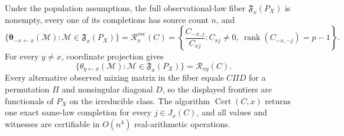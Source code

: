 Under the population assumptions, the full observational-law fiber \(\mathfrak F_x(P_X)\) is nonempty, every one of its completions has source count \(n\), and
\[
 \{\boldsymbol\theta_{-x\leftarrow x}(\mathcal M):\mathcal M\in\mathfrak F_x(P_X)\}
 =\mathcal R_x^{\mathrm{vec}}(C)
 =\left\{\frac{C_{-x,j}}{C_{xj}}:C_{xj}\ne0,\ \operatorname{rank}(C_{-x,-j})=p-1\right\}.
\]
For every \(y\ne x\), coordinate projection gives
\[
 \{\theta_{y\leftarrow x}(\mathcal M):\mathcal M\in\mathfrak F_x(P_X)\}
 =\mathcal R_{xy}(C).
\]
Every alternative observed mixing matrix in the fiber equals \(C\Pi D\) for a permutation \(\Pi\) and nonsingular diagonal \(D\), so the displayed frontiers are functionals of \(P_X\) on the irreducible class. The algorithm \(\operatorname{Cert}(C,x)\) returns one exact same-law completion for every \(j\in J_x(C)\), and all values and witnesses are certifiable in \(O(n^4)\) real-arithmetic operations.
